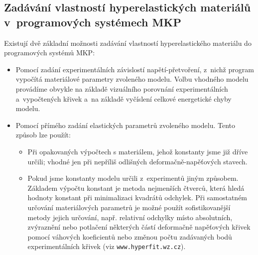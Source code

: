 \subsection{Zadávání vlastností hyperelastických materiálů v~programových systémech MKP}
Existují dvě základní možnosti zadávání vlastností hyperelastického materiálu do programových systémů MKP:
\begin{itemize}
	\item Pomocí zadání experimentálních závislostí napětí-přetvoření, z~nichž program vypočítá materiálové parametry zvoleného modelu. Volbu vhodného modelu provádíme obvykle na základě vizuálního porovnání experimentálních a~vypočtených křivek a~na základě vyčíslení celkové energetické chyby modelu.
	\item Pomocí přímého zadání elastických parametrů zvoleného modelu. Tento způsob lze použít:
	\begin{itemize}
		\item Při opakovaných výpočtech s materiálem, jehož konstanty jsme již dříve určili; vhodné jen při nepříliš odlišných deformačně-napěťových stavech.
		\item Pokud jsme konstanty modelu určili z~experimentů jiným způsobem. Základem výpočtu konstant je metoda nejmenších čtverců, která hledá hodnoty konstant při minimalizaci kvadrátů odchylek. Při samostatném určování materiálových parametrů je možné použít sofistikovanější metody jejich určování, např. relativní odchylky místo absolutních, zvýraznění nebo potlačení některých částí deformačně napěťových křivek pomocí váhových koeficientů nebo změnou počtu zadávaných bodů experimentálních křivek (viz \texttt{www.hyperfit.wz.cz}).
	\end{itemize}
\end{itemize}

